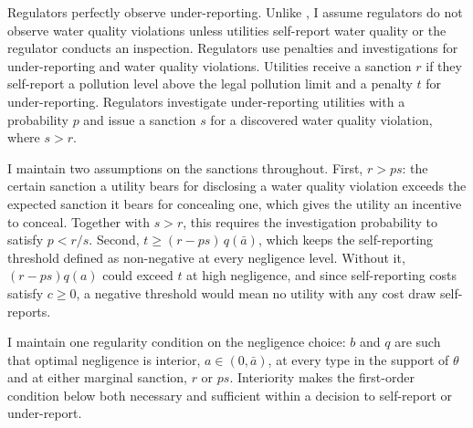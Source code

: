\documentclass[12pt]{article}
\begin{document}
	Regulators perfectly observe under-reporting. Unlike \textcite{mookherjee1994marginal}, I assume regulators do not observe water quality violations unless utilities self-report water quality or the regulator conducts an inspection. Regulators use penalties and investigations for under-reporting and water quality violations. Utilities receive a sanction $r$ if they self-report a pollution level above the legal pollution limit and a penalty $t$ for under-reporting. Regulators investigate under-reporting utilities with a probability $p$ and issue a sanction $s$ for a discovered water quality violation, where $s>r$.

	I maintain two assumptions on the sanctions throughout. First, $r > ps$: the certain sanction a utility bears for disclosing a water quality violation exceeds the expected sanction it bears for concealing one, which gives the utility an incentive to conceal. Together with $s>r$, this requires the investigation probability to satisfy $p < r/s$. Second, $t \ge (r-ps)\,q(\bar{a})$, which keeps the self-reporting threshold defined as non-negative at every negligence level. Without it, $(r-ps)q(a)$ could exceed $t$ at high negligence, and since self-reporting costs satisfy $c \ge 0$, a negative threshold would mean no utility with any cost draw self-reports.

	I maintain one regularity condition on the negligence choice: $b$ and $q$ are such that optimal negligence is interior, $a \in (0,\bar{a})$, at every type in the support of $\theta$ and at either marginal sanction, $r$ or $ps$. Interiority makes the first-order condition below both necessary and sufficient within a decision to self-report or under-report.

	
\end{document}
